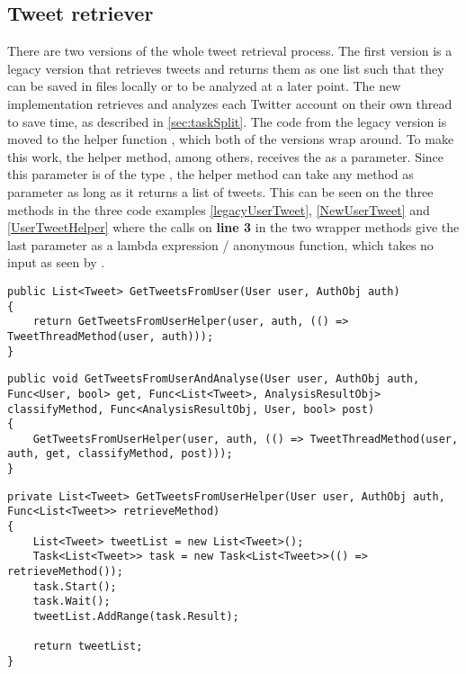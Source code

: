 \subsection{Tweet retriever} \label{sub:tweetretriever}
There are two versions of the whole tweet retrieval process. The first version
is a legacy version that retrieves tweets and returns them as one list such that
they can be saved in files locally or to be analyzed at a later point.
The new implementation retrieves and analyzes each Twitter account on their own
thread to save time, as described in \autoref{sec:taskSplit}. The code from the
legacy version is moved to the helper function ,
which both of the versions wrap around. To make this work, the helper method,
among others, receives the  as a parameter. Since this
parameter is of the type , the helper method can take
any method as parameter as long as it returns a list of tweets. This can be
seen on the three methods in the three code examples \autoref{legacyUserTweet},
\autoref{NewUserTweet} and \autoref{UserTweetHelper} where the calls on
\textbf{line 3} in the two wrapper methods give the last parameter as a lambda
expression / anonymous function, which takes no input as seen by \textc{()=>}.\\

\begin{minipage}[H]{\linewidth}
\begin{lstlisting}[caption = Legacy method call , label = legacyUserTweet ] 
public List<Tweet> GetTweetsFromUser(User user, AuthObj auth)
{	
    return GetTweetsFromUserHelper(user, auth, (() => TweetThreadMethod(user, auth)));
}
\end{lstlisting}
\end{minipage}

\begin{minipage}[H]{\linewidth}
\begin{lstlisting}[caption = Current method call to speed up execution , label =
NewUserTweet ] 
public void GetTweetsFromUserAndAnalyse(User user, AuthObj auth, Func<User, bool> get, Func<List<Tweet>, AnalysisResultObj> classifyMethod, Func<AnalysisResultObj, User, bool> post)
{
    GetTweetsFromUserHelper(user, auth, (() => TweetThreadMethod(user, auth, get, classifyMethod, post)));
}
\end{lstlisting}
\end{minipage}

\begin{minipage}[H]{\linewidth}
\begin{lstlisting}[caption = The GetTweetsFromUserHelper, label =
UserTweetHelper]
private List<Tweet> GetTweetsFromUserHelper(User user, AuthObj auth, Func<List<Tweet>> retrieveMethod)
{
    List<Tweet> tweetList = new List<Tweet>();
    Task<List<Tweet>> task = new Task<List<Tweet>>(() => retrieveMethod());
    task.Start();
    task.Wait();
    tweetList.AddRange(task.Result);

    return tweetList;
}
\end{lstlisting}
\end{minipage}

